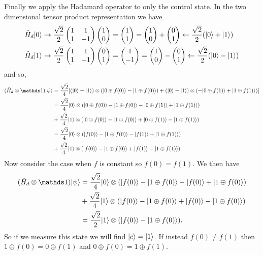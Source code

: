     Finally we apply the Hadamard operator to only the control state.
    In the two dimensional tensor product representation we have
    \begin{align*}
        \hat{H}_d\vert {0} \rangle &\mathrel{\rightarrow} \frac{\sqrt{2}}{2}\begin{pmatrix} {1} & {1}\\ {1} & {-1} \end{pmatrix}\begin{pmatrix} {1} \\ {0} \end{pmatrix} = \begin{pmatrix} {1} \\ {1} \end{pmatrix} = \begin{pmatrix} {1} \\ {0} \end{pmatrix} + \begin{pmatrix} {0} \\ {1} \end{pmatrix} \mathrel{\leftarrow} \frac{\sqrt{2}}{2}(\vert {0} \rangle + \vert {1} \rangle)\\
        \hat{H}_d\vert {1} \rangle &\mathrel{\rightarrow} \frac{\sqrt{2}}{2}\begin{pmatrix} {1} & {1}\\ {1} & {-1} \end{pmatrix}\begin{pmatrix} {0} \\ {1} \end{pmatrix} = \begin{pmatrix} {1} \\ {-1} \end{pmatrix} = \begin{pmatrix} {1} \\ {0} \end{pmatrix} - \begin{pmatrix} {0} \\ {1} \end{pmatrix} \mathrel{\leftarrow} \frac{\sqrt{2}}{2}(\vert {0} \rangle - \vert {1} \rangle)\\
    \end{align*}
    and so,
    \begin{align*}
        (\operator{H}_d\tensorProd\ident)\ket{\psi} &= \frac{\sqrt{2}}{4}[(\ket{0} + \ket{1})\tensorProd(\ket{0\oplus f(0)} - \ket{1\oplus f(0)}) + (\ket{0} - \ket{1})\tensorProd (-\ket{0\oplus f(1)} + \ket{1\oplus f(1)})]\\
        &= \frac{\sqrt{2}}{4} \ket{0} \tensorProd (\ket{0\oplus f(0)} - \ket{1 \oplus f(0)} - \ket{0 \oplus f(1)} + \ket{1 \oplus f(1)})\\
        &+ \frac{\sqrt{2}}{4}\ket{1} \tensorProd (\ket{0\oplus f(0)} - \ket{1\oplus f(0)} + \ket{0\oplus f(1)} - \ket{1\oplus f(1)})\\
        &= \frac{\sqrt{2}}{4} \ket{0} \tensorProd (\ket{f(0)} - \ket{1 \oplus f(0)} - \ket{f(1)} + \ket{1 \oplus f(1)})\\
        &+ \frac{\sqrt{2}}{4}\ket{1} \tensorProd (\ket{f(0)} - \ket{1\oplus f(0)} + \ket{f(1)} - \ket{1\oplus f(1)})\\
    \end{align*}
    Now consider the case when \(f\) is constant so \(f(0) = f(1)\).
    We then have
    \begin{align*}
        (\operator{H}_d\tensorProd\ident)\ket{\psi} &= \frac{\sqrt{2}}{4}\ket{0} \tensorProd (\ket{f(0)} - \ket{1\oplus f(0)} - \ket{f(0)} + \ket{1\oplus f(0)})\\
        &+ \frac{\sqrt{2}}{4}\ket{1}\tensorProd (\ket{f(0)} - \ket{1 \oplus f(0)} + \ket{f(0)} - \ket{1 \oplus f(0)})\\
        &= \frac{\sqrt{2}}{2}\ket{1}\tensorProd (\ket{f(0)} - \ket{1 \oplus f(0)}).
    \end{align*}
    So if we measure this state we will find \(\vert {c} \rangle = \vert {1} \rangle\).
    If instead \(f(0) \ne f(1)\) then \(1 \oplus f(0) = 0\oplus f(1)\) and \(0 \oplus f(0) = 1\oplus f(1)\).
